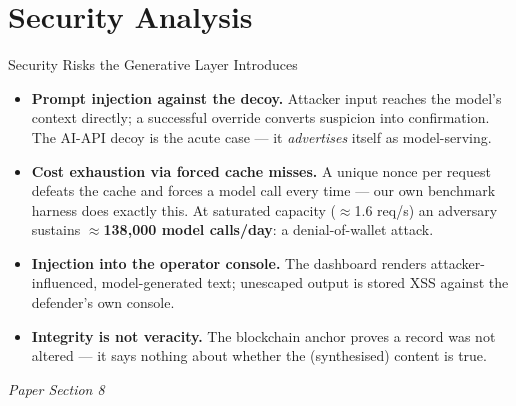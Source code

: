 \documentclass[aspectratio=169, 11pt]{beamer}
\newcommand{\srcnote}[1]{{\footnotesize\color{gray}\textit{#1}}}
\begin{document}
\section{Security Analysis}
\begin{frame}{Security Risks the Generative Layer Introduces}
    \begin{itemize}
        \item \textbf{Prompt injection against the decoy.} Attacker input reaches the model's context directly; a successful override converts suspicion into confirmation. The AI-API decoy is the acute case --- it \emph{advertises} itself as model-serving.
        \item \textbf{Cost exhaustion via forced cache misses.} A unique nonce per request defeats the cache and forces a model call every time --- our own benchmark harness does exactly this. At saturated capacity ($\approx$1.6 req/s) an adversary sustains $\approx$\textbf{138{,}000 model calls/day}: a denial-of-wallet attack.
        \item \textbf{Injection into the operator console.} The dashboard renders attacker-influenced, model-generated text; unescaped output is stored XSS against the defender's own console.
        \item \textbf{Integrity is not veracity.} The blockchain anchor proves a record was not altered --- it says nothing about whether the (synthesised) content is true.
    \end{itemize}
    \srcnote{Paper Section 8}
\end{frame}

\end{document}
